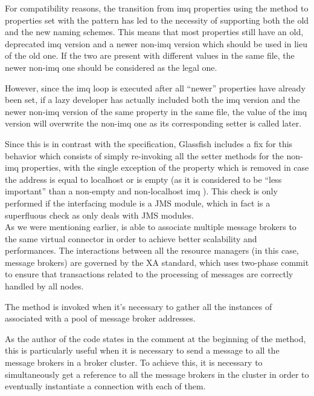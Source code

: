 For compatibility reasons, the transition from imq properties using the  method to properties set with the  pattern has led to the necessity of supporting both the old and the new naming schemes. This means that most properties still have an old, deprecated imq version and a newer non-imq version which should be used in lieu of the old one. If the two are present with different values in the same file, the newer non-imq one should be considered as the legal one.

However, since the imq loop is executed after all “newer” properties have already been set, if a lazy developer has actually included both the imq version and the newer non-imq version of the same property in the same file, the value of the imq version will overwrite the non-imq one as its corresponding setter is called later.

Since this is in contrast with the specification, Glassfish includes a fix for this behavior which consists of simply re-invoking all the setter methods for the non-imq properties, with the single exception of the  property which is removed in case the address is equal to localhost or is empty (as it is considered to be “less important” than a non-empty and non-localhost imq ). This check is only performed if the interfacing module is a JMS module, which in fact is a superfluous check as  only deals with JMS modules. \\

As we were mentioning earlier,  is able to associate multiple message brokers to the same virtual connector in order to achieve better scalability and performances. The interactions between all the resource managers (in this case, message brokers) are governed by the XA standard, which uses two-phase commit to ensure that transactions related to the processing of messages are correctly handled by all nodes.

The  method is invoked when it's necessary to gather all the instances of  associated with a pool of message broker addresses.

As the author of the code states in the comment at the beginning of the method, this is particularly useful when it is necessary to send a message to all the message brokers in a broker cluster. To achieve this, it is necessary to simultaneously get a reference to all the message brokers in the cluster in order to eventually instantiate a connection with each of them.

